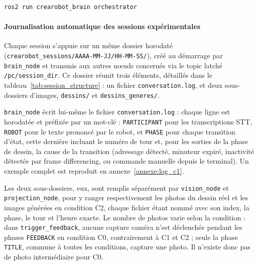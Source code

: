 \documentclass[11pt]{article}
\begin{document}
\begin{verbatim}
ros2 run crearobot_brain orchestrator
\end{verbatim}

\paragraph{Journalisation automatique des sessions expérimentales}
\label{sec:logging}

Chaque session s'appuie sur un même dossier horodaté (\texttt{crearobot\_sessions/AAAA-MM-JJ/HH-MM-SS/}), créé au démarrage par \texttt{brain\_node} et transmis aux autres nœuds concernés via le topic latché \texttt{/pc/session\_dir}. Ce dossier réunit trois éléments, détaillés dans le tableau~\ref{tab:session_structure} : un fichier \texttt{conversation.log}, et deux sous-dossiers d'images, \texttt{dessins/} et \texttt{dessins\_generes/}.

\texttt{brain\_node} écrit lui-même le fichier \texttt{conversation.log} : chaque ligne est horodatée et préfixée par un mot-clé : \texttt{PARTICIPANT} pour les transcriptions STT, \texttt{ROBOT} pour le texte prononcé par le robot, et \texttt{PHASE} pour chaque transition d'état, cette dernière incluant le numéro de tour et, pour les sorties de la phase de dessin, la cause de la transition (adressage détecté, minuteur expiré, inactivité détectée par frame differencing, ou commande manuelle depuis le terminal). Un exemple complet est reproduit en annexe~\ref{annexe:log_c1}.

Les deux sous-dossiers, eux, sont remplis séparément par \texttt{vision\_node} et \texttt{projection\_node}, pour y ranger respectivement les photos du dessin réel et les images générées en condition C2, chaque fichier étant nommé avec son index, la phase, le tour et l'heure exacte. Le nombre de photos varie selon la condition : dans \texttt{trigger\_feedback}, aucune capture caméra n'est déclenchée pendant les phases \texttt{FEEDBACK} en condition C0, contrairement à C1 et C2 ; seule la phase \texttt{TITLE}, commune à toutes les conditions, capture une photo. Il n'existe donc pas de photo intermédiaire pour C0.
\end{document}
